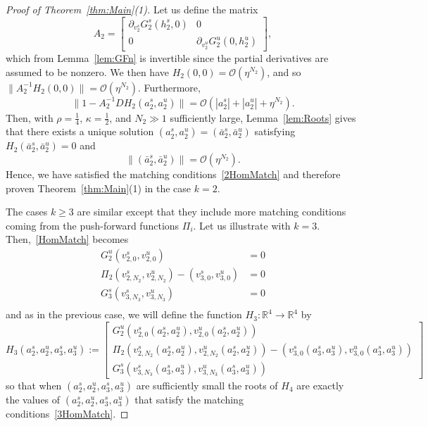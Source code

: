 \documentclass[11pt]{article}
\newcommand{\R}{\mathbb{R}}
\numberwithin{equation}{section}
\theoremstyle{plain}
\begin{document}
\begin{proof}[Proof of Theorem~\ref{thm:Main}(1)]
	Let us define the matrix 
	\begin{equation}
		A_2 = \begin{bmatrix}
			\partial_{v^s_2}G^s_2(h^s_2,0) & 0 \\ 0 & \partial_{v^u_2}G^u_2(0,h^u_2)
		\end{bmatrix},
	\end{equation}
	which from Lemma~\ref{lem:GFn} is invertible since the partial derivatives are assumed to be nonzero. We then have $H_2(0,0) = \mathcal{O}(\eta^{N_2})$, and so $\|A_2^{-1}H_2(0,0)\| = \mathcal{O}(\eta^{N_2})$. Furthermore, 
	\begin{equation}
		\|1 - A_2^{-1}DH_2(a^s_2,a^u_2)\| = \mathcal{O}(|a^s_2| + |a^u_2| + \eta^{N_2}).
	\end{equation}
	Then, with $\rho = \frac{1}{4}$, $\kappa = \frac{1}{2}$, and $N_2 \gg 1$ sufficiently large, Lemma~\ref{lem:Roots} gives that there exists a unique solution $(a^s_2,a^u_2) = (\bar a^s_2,\bar a^u_2)$ satisfying $H_2(\bar a^s_2,\bar a^u_2) = 0$ and 
	\begin{equation}
		\|(\bar a^s_2,\bar a^u_2)\| = \mathcal{O}(\eta^{N_2}).
	\end{equation}
	Hence, we have satisfied the matching conditions~\eqref{2HomMatch} and therefore proven Theorem~\ref{thm:Main}(1) in the case $k = 2$.
	
	The cases $k \geq 3$ are similar except that they include more matching conditions coming from the push-forward functions $\Pi_i$. Let us illustrate with $k = 3$. Then,~\eqref{HomMatch} becomes 
	\begin{equation}\label{3HomMatch}
\begin{split}
		G^u_2(v^s_{2,0},v^u_{2,0}) &= 0 \\
		\Pi_2(v^s_{2,N_2},v^u_{2,N_2}) - (v^s_{3,0},v^u_{3,0}) &= 0 \\
		G^s_3(v^s_{3,N_{3}},v^u_{3,N_{3}}) &= 0 \\
	\end{split}
\end{equation}
and as in the previous case, we will define the function $H_3:\R^4 \to \R^4$ by
\begin{equation}
	H_3(a^s_2,a^u_2,a^s_3,a^u_3) := \begin{bmatrix}
		G^u_2(v^s_{2,0}(a^s_2,a^u_2),v^u_{2,0}(a^s_2,a^u_2)) \\ \Pi_2(v^s_{2,N_2}(a^s_2,a^u_2),v^u_{2,N_2}(a^s_2,a^u_2)) - (v^s_{3,0}(a^s_3,a^u_3),v^u_{3,0}(a^s_3,a^u_3)) \\ G^s_3(v^s_{3,N_3}(a^s_3,a^u_3),v^u_{3,N_3}(a^s_3,a^u_3))	
	\end{bmatrix}
\end{equation}
so that when $(a^s_2,a^u_2,a^s_3,a^u_3)$ are sufficiently small the roots of $H_4$ are exactly the values of $(a^s_2,a^u_2,a^s_3,a^u_3)$ that satisfy the matching conditions~\eqref{3HomMatch}.


\end{proof}
\end{document}

